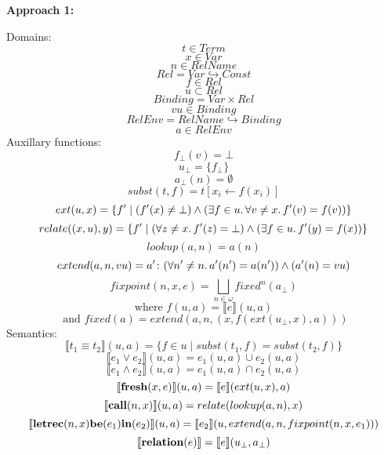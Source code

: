 \documentclass[11pt]{article}
\begin{document}
\begin{center}
\textbf {Approach 1:}
\end{center}
\newcommand{\keyword}[1]{\textrm{\textbf{#1}}}
\newcommand{\semantics}[1]{\llbracket#1\rrbracket}
Domains:
$$ t \in Term $$
$$ x \in Var $$
$$ n \in RelName $$
$$ Rel = Var \hookrightarrow Const $$
$$ f \in Rel $$
$$ u \subset Rel $$
$$ Binding = Var \times Rel $$
$$ vu \in Binding $$
$$ RelEnv = RelName \hookrightarrow Binding $$
$$ a \in RelEnv $$
Auxillary functions:
$$ f_\bot(v) = \bot $$
$$ u_\bot = \{f_\bot\} $$
$$ a_\bot(n) = \emptyset $$
$$ subst(t,f) = t[x_i \leftarrow f(x_i)] $$
$$ ext(u,x) = \{ f' \mid (f'(x) \neq \bot) \wedge (\exists f \in u \ldotp \forall v \neq x \ldotp f'(v) = f(v)) \} $$
$$ relate((x,u), y) = \{ f' \mid (\forall z \neq x \ldotp f'(z) = \bot) \wedge (\exists f \in u \ldotp f'(y) = f(x)) \} $$
$$ lookup(a,n) = a(n) $$
$$ extend(a,n,vu) = a' \colon (\forall n' \neq n \ldotp a'(n') = a(n')) \wedge (a'(n) = vu) $$
$$ fixpoint(n, x, e) = \bigsqcup_{n \in \omega} fixed^n(a_\bot) $$
$$ \textrm{where } f(u, a) = \semantics{e}(u, a) $$
$$ \textrm{ and } fixed(a) = extend(a, n, (x, f(ext(u_\bot, x),a))) $$
\newpage
Semantics:
$$ \semantics{t_1 \equiv t_2}(u, a) = \{ f \in u  \mid subst(t_1, f) = subst(t_2, f) \} $$
$$ \semantics{e_1 \vee e_2} (u, a) = e_1(u, a) \cup e_2(u, a) $$
$$ \semantics{e_1 \wedge e_2}(u, a) = e_1(u, a) \cap e_2(u, a) $$
$$ \semantics{\keyword{fresh}(x,e)}(u, a) = \semantics{e}(ext(u,x), a) $$
$$ \semantics{\keyword{call}(n,x)}(u, a) = relate(lookup(a,n), x) $$
$$ \semantics{\keyword{letrec} (n, x) \keyword{be} (e_1) \keyword{in} (e_2)} (u, a) = \semantics{e_2}(u, extend(a, n, fixpoint(n, x, e_1))) $$
$$ \semantics{\keyword{relation} (e)} = \semantics{e}(u_\bot, a_\bot) $$

\begin{center}

\end{center}
\end{document}
